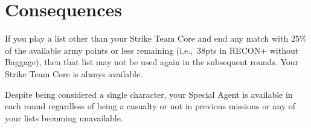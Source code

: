 \section{Consequences}

If you play a list other than your Strike Team Core and end any match
with 25\% of the available army points or less remaining (i.e.,~38pts
in RECON+ without Baggage), then that list may not be used again in
the subsequent rounds.  Your Strike Team Core is always available.

Despite being considered a single character, your Special Agent is
available in each round regardless of being a casualty or not in
previous missions or any of your lists becoming unavailable.
